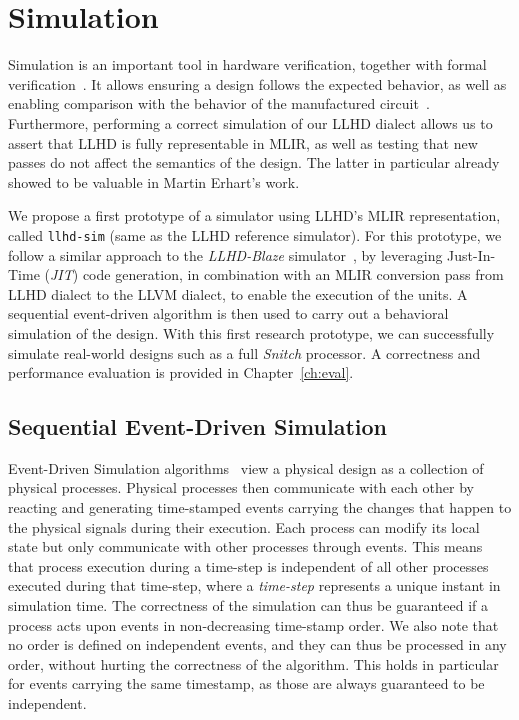
\chapter{Simulation}
\label{ch:sim}

Simulation is an important tool in hardware verification, together with formal verification~\cite{YuanLu2001, Kumar1998}. It allows ensuring a design follows the expected behavior, as well as enabling comparison with the behavior of the manufactured circuit~\cite{Ashenden1994}.
Furthermore, performing a correct simulation of our LLHD dialect allows us to assert that LLHD is fully representable in MLIR, as well as testing that new passes do not affect the semantics of the design. The latter in particular already showed to be valuable in Martin Erhart's work.

We propose a first prototype of a simulator using LLHD's MLIR representation, called \texttt{llhd-sim} (same as the LLHD reference simulator). For this prototype, we follow a similar approach to the \textit{LLHD-Blaze} simulator~\cite{Schuiki2020}, by leveraging Just-In-Time (\textit{JIT}) code generation, in combination with an MLIR conversion pass from LLHD dialect to the LLVM dialect, to enable the execution of the units. A sequential event-driven algorithm is then used to carry out a behavioral simulation of the design. With this first research prototype, we can successfully simulate real-world designs such as a full \textit{Snitch} \cite{Zaruba2020} processor. A correctness and performance evaluation is provided in Chapter~\ref{ch:eval}.


\section{Sequential Event-Driven Simulation}
Event-Driven Simulation algorithms~\cite{Ashenden1994} view a physical design as a collection of physical processes. Physical processes then communicate with each other by reacting and generating time-stamped events carrying the changes that happen to the physical signals during their execution. Each process can modify its local state but only communicate with other processes through events. This means that process execution during a time-step is independent of all other processes executed during that time-step, where a \textit{time-step} represents a unique instant in simulation time. The correctness of the simulation can thus be guaranteed if a process acts upon events in non-decreasing time-stamp order. We also note that no order is defined on independent events, and they can thus be processed in any order, without hurting the correctness of the algorithm. This holds in particular for events carrying the same timestamp, as those are always guaranteed to be independent.

